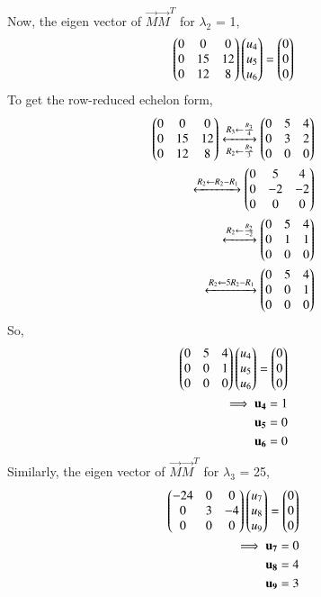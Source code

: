 \documentclass[journal,12pt,twocolumn]{IEEEtran}
\begin{document}
Now, the eigen vector of $\vec{M}\vec{M}^T $ for $\lambda_2$ = 1,
\begin{align}
\begin{pmatrix}0 & 0 & 0\\0 & 15 &12\\0 & 12 & 8\end{pmatrix} \begin{pmatrix}u_4\\u_5\\u_6\end{pmatrix} = \begin{pmatrix}0\\0\\0\end{pmatrix}\\
\end{align}
To get the row-reduced echelon form,
\begin{align}
\begin{pmatrix}0 & 0 & 0\\0 & 15 &12\\0 & 12 & 8\end{pmatrix} \xleftrightarrow[R_2\leftarrow\frac{R_2}{3}]{R_3\leftarrow \frac{R_3}{4}} \begin{pmatrix}0 & 5 & 4\\0 &3 &2\\0 &0&0\end{pmatrix}\\
\xleftrightarrow[]{R_2\leftarrow R_2-R_1}\begin{pmatrix}0 & 5 & 4\\0 &-2 &-2\\0 &0&0\end{pmatrix}\\
\xleftrightarrow[]{R_2\leftarrow \frac{R_2}{-2}}\begin{pmatrix}0 & 5 & 4\\0 &1 &1\\0 &0&0\end{pmatrix}\\
\xleftrightarrow[]{R_2\leftarrow 5 R_2 - R_1}\begin{pmatrix}0 & 5 & 4\\0 &0 &1\\0 &0&0\end{pmatrix}
\end{align}
So,
\begin{align}
\begin{pmatrix}0 & 5 & 4\\0 &0 &1\\0 &0&0\end{pmatrix}\begin{pmatrix}u_4\\u_5\\u_6\end{pmatrix} = \begin{pmatrix}0\\0\\0\end{pmatrix}\\
\implies \mathbf{u_4}=1\\
\mathbf{u_5}=0\\
\mathbf{u_6}=0
\end{align}
Similarly, the eigen vector of $\vec{M}\vec{M}^T $ for $\lambda_3$ = 25,
\begin{align}
\begin{pmatrix}-24 & 0 & 0\\0 &3 &-4\\0 &0&0\end{pmatrix}\begin{pmatrix}u_7\\u_8\\u_9\end{pmatrix} = \begin{pmatrix}0\\0\\0\end{pmatrix}\\
\implies \mathbf{u_7}=0\\
\mathbf{u_8}=4\\
\mathbf{u_9}=3
\end{align}
\end{document}
